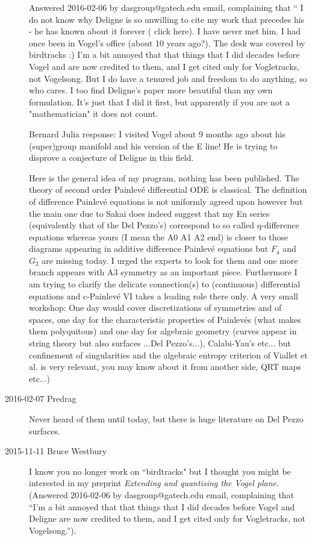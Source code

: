 \begin{description}
Answered 2016-02-06 by dasgroup@gatech.edu email,
complaining that `` I do not know why Deligne is so unwilling to cite my
work that precedes his - he has known about it forever
( {click here}). I
have never met him. I had once been in Vogel's office (about 10 years
ago?). The desk was covered by birdtracks :) I'm a bit annoyed that that
things that I did decades before Vogel and are now credited to them, and
I get cited only for Vogletracks, not Vogelsong. But I do have a tenured
job and freedom to do anything, so who cares. I too find Deligne's paper
more beautiful than my own formulation. It's just that I did it first,
but apparently if you are not a "mathematician" it does not count.

Bernard Julia response:
I visited Vogel about 9 months ago about his (super)group manifold and
his version of the E line! He is trying to disprove a conjecture of
Deligne in this field.

Here is the general idea of my program, nothing has been published.
The theory of second order Painlev\'e differential ODE is classical. The
definition of difference Painlev\'e equations is not uniformly agreed upon
however but the main one due to Sakai does indeed suggest that my En
series (equivalently that of the Del Pezzo's) correspond to so called
q-difference equations whereas yours (I mean the A0 A1 A2 end) is closer to
those diagrams appearing in additive difference Painlev\'e equations but $F_4$
and $G_2$ are missing today. I urged the experts to look for them and one more
branch appears with A3 symmetry as an important piece. Furthermore I am
trying to clarify  the delicate connection(s) to (continuous) differential
equations and c-Painlev\'e VI takes a leading role there only.
A very small workshop: One day would cover discretizations of
symmetries and of spaces, one day for the characteristic properties of
Painlev\'es (what makes them polyquitous) and one day for algebraic geometry
(curves appear in string theory but also surfaces ...Del Pezzo's...),
Calabi-Yau's etc... but confinement of singularities and the algebraic
entropy criterion of Viallet et al. is very relevant, you may know about
it from another side, QRT maps etc...)

\item[2016-02-07  Predrag]
Never heard of them until today, but there is huge literature on
 {Del Pezzo
surfaces}.


\item[2015-11-11 Bruce Westbury]
I know you no longer work on ``birdtracks" but I thought you might be
interested in my preprint {\em Extending and quantising
the Vogel plane}. \\
(Answered 2016-02-06 by dasgroup@gatech.edu email,
complaining that ``I'm a bit annoyed that that things that I did decades
before Vogel and Deligne are now credited to them, and I get cited only
for Vogletracks, not Vogelsong.'').


\end{description}
